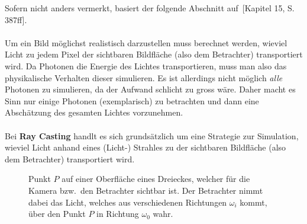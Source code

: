 Sofern nicht anders vermerkt, basiert der folgende Abschnitt auf~\cite{hughes_computer_2013}[Kapitel 15, S. 387ff].\\
\\
Um ein Bild möglichst realistisch darzustellen muss berechnet werden, wieviel Licht zu jedem Pixel der sichtbaren Bildfläche (also dem Betrachter) transportiert wird. Da Photonen die Energie des Lichtes transportieren, muss man also das physikalische Verhalten dieser simulieren. Es ist allerdings nicht möglich \textit{alle} Photonen zu simulieren, da der Aufwand schlicht zu gross wäre. Daher macht es Sinn nur einige Photonen (exemplarisch) zu betrachten und dann eine Abschätzung des gesamten Lichtes vorzunehmen.\\
\\
Bei \textbf{Ray Casting} handlt es sich grundsätzlich um eine Strategie zur Simulation, wieviel Licht anhand eines (Licht-) Strahles zu der sichtbaren Bildfläche (also dem Betrachter) transportiert wird.

\begin{figure}[H]
    \centering {}
    \caption{Punkt $P$ auf einer Oberfläche eines Dreieckes, welcher für die Kamera bzw.\ den Betrachter sichtbar ist.
        Der Betrachter nimmt dabei das Licht, welches aus verschiedenen Richtungen $\omega_{i}$ kommt, über den Punkt $P$ in Richtung $\omega_{0}$ wahr.\label{fig:ray_casting:basics}\protect\footnotemark}
\end{figure}

